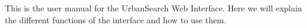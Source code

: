 This is the user manual for the UrbanSearch Web Interface. Here we will explain the different functions of the interface and how to use them. 